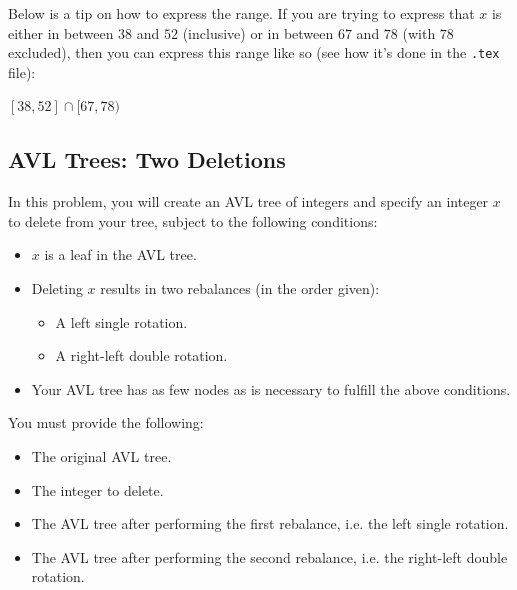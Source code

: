 \documentclass{article}
\begin{document}
\begin{mdframed}
\vspace{3em}
\end{mdframed}

Below is a tip on how to express the range. If you are trying to express that $x$ is either in between $38$ and $52$ (inclusive) or in between $67$ and $78$ (with $78$ excluded), then you can express this range like so (see how it's done in the \lstinline{.tex} file):

$[38,52]\cap[67,78)$

\subsection{AVL Trees: Two Deletions}

In this problem, you will create an AVL tree of integers and specify an integer $x$ to delete from your tree, subject to the following conditions:

\begin{itemize}[itemsep=0mm, parsep=0pt]
\item $x$ is a leaf in the AVL tree.
\item Deleting $x$ results in two rebalances (in the order given):
    \begin{itemize}[itemsep=0mm, parsep=0pt]
    \item A left single rotation.
    \item A right-left double rotation.
    \end{itemize}
\item Your AVL tree has as few nodes as is necessary to fulfill the above conditions.
\end{itemize}

You must provide the following:

\begin{itemize}[itemsep=0mm, parsep=0pt]
\item The original AVL tree.
\item The integer to delete.
\item The AVL tree after performing the first rebalance, i.e. the left single rotation.
\item The AVL tree after performing the second rebalance, i.e. the right-left double rotation.
\end{itemize}

\begin{mdframed}
\vspace{3em}
\end{mdframed}
\end{document}
